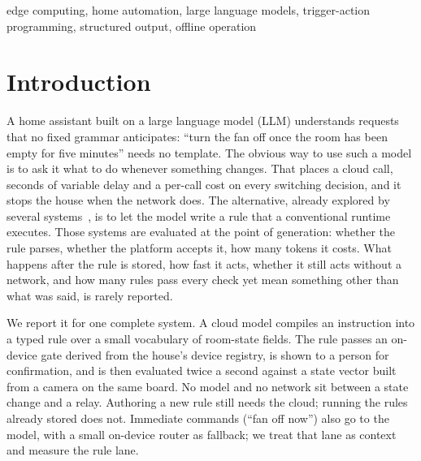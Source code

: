 \documentclass[conference]{IEEEtran}
\begin{document}
\begin{IEEEkeywords}
edge computing, home automation, large language models, trigger-action
programming, structured output, offline operation
\end{IEEEkeywords}

\section{Introduction}\label{sec:intro}

A home assistant built on a large language model (LLM) understands requests
that no fixed grammar anticipates: ``turn the fan off once the room has been
empty for five minutes'' needs no template. The obvious way to use such a model
is to ask it what to do whenever something changes. That places a cloud call,
seconds of variable delay and a per-call cost on every switching decision, and
it stops the house when the network does. The alternative, already explored by
several systems~\cite{chatiot,giudici,autoiot,farm}, is to let the model write
a rule that a conventional runtime executes. Those systems are evaluated at the
point of generation: whether the rule parses, whether the platform accepts it,
how many tokens it costs. What happens after the rule is stored, how fast it
acts, whether it still acts without a network, and how many rules pass every
check yet mean something other than what was said, is rarely reported.

We report it for one complete system. A cloud model compiles an instruction
into a typed rule over a small vocabulary of room-state fields. The rule passes
an on-device gate derived from the house's device registry, is shown to a
person for confirmation, and is then evaluated twice a second against a state
vector built from a camera on the same board. No model and no network sit
between a state change and a relay. Authoring a new rule still needs the cloud; running the rules already stored
does not. Immediate commands (``fan off now'') also go to the model, with a
small on-device router as fallback; we treat that lane as context and measure
the rule lane.
\end{document}
